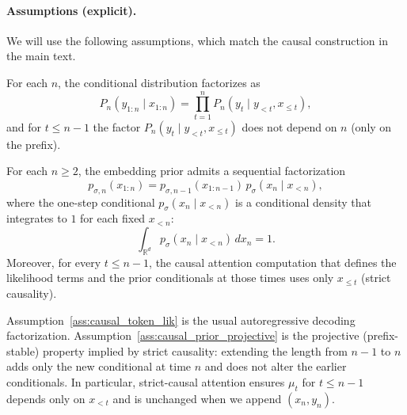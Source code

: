 \documentclass[11pt]{article}
\begin{document}
\paragraph{Assumptions (explicit).}
We will use the following assumptions, which match the causal construction in the main text.

\begin{assumption}
\label{ass:causal_token_lik}
For each $n$, the conditional distribution factorizes as
\begin{equation}
P_n(y_{1:n}\mid x_{1:n})
=
\prod_{t=1}^n P_n(y_t\mid y_{<t}, x_{\le t}),
\label{eq:appendix_obs_causal}
\end{equation}
and for $t\le n-1$ the factor $P_n(y_t\mid y_{<t},x_{\le t})$ does not depend on $n$ (only on the prefix).
\end{assumption}

\begin{assumption}
\label{ass:causal_prior_projective}
For each $n\ge 2$, the embedding prior admits a sequential factorization
\begin{equation}
p_{\sigma,n}(x_{1:n})
=
p_{\sigma,n-1}(x_{1:n-1})\,p_{\sigma}(x_n\mid x_{<n}),
\label{eq:appendix_prior_factor}
\end{equation}
where the one-step conditional $p_{\sigma}(x_n\mid x_{<n})$ is a conditional density that integrates to $1$ for each fixed $x_{<n}$:
\begin{equation}
\int_{\mathbb R^{d}} p_{\sigma}(x_n\mid x_{<n})\,dx_n = 1.
\label{eq:appendix_prior_cond_normalized}
\end{equation}
Moreover, for every $t\le n-1$, the causal attention computation that defines the likelihood terms
and the prior conditionals at those times uses only $x_{\le t}$ (strict causality).
\end{assumption}

\begin{remark}
Assumption~\ref{ass:causal_token_lik} is the usual autoregressive decoding factorization.
Assumption~\ref{ass:causal_prior_projective} is the projective (prefix-stable) property implied by strict causality:
extending the length from $n-1$ to $n$ adds only the new conditional at time $n$ and does not alter
the earlier conditionals. In particular, strict-causal attention ensures $\mu_t$ for $t\le n-1$ depends
only on $x_{<t}$ and is unchanged when we append $(x_n,y_n)$.
\end{remark}
\end{document}
